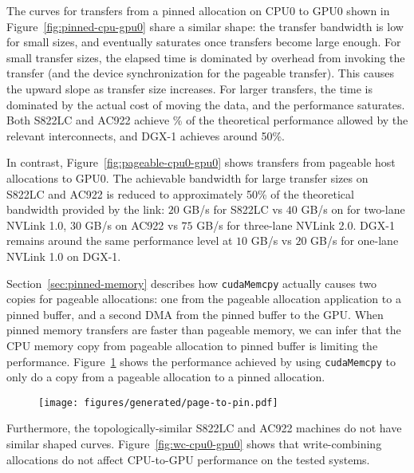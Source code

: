 The curves for transfers from a pinned allocation on CPU0 to GPU0 shown in Figure~\ref{fig:pinned-cpu-gpu0} share a similar shape: the transfer bandwidth is low for small sizes, and eventually saturates once transfers become large enough.
For small transfer sizes, the elapsed time is dominated by overhead from invoking the transfer (and the device synchronization for the pageable transfer).
This causes the upward slope as transfer size increases.
For larger transfers, the time is dominated by the actual cost of moving the data, and the performance saturates.
Both S822LC and AC922 achieve \% of the theoretical performance allowed by the relevant interconnects, and DGX-1 achieves around 50\%.


In contrast, Figure~\ref{fig:pageable-cpu0-gpu0} shows transfers from pageable host allocations to GPU0.
The achievable bandwidth for large transfer sizes on S822LC and AC922 is reduced to approximately 50\% of the theoretical bandwidth provided by the link: $20$ GB/s for S822LC vs $40$ GB/s on for two-lane NVLink 1.0, $30$ GB/s on AC922 vs $75$ GB/s for three-lane NVLink 2.0.
DGX-1 remains around the same performance level at $10$ GB/s vs $20$ GB/s for one-lane NVLink 1.0 on DGX-1.

Section~\ref{sec:pinned-memory} describes how \texttt{cudaMemcpy} actually causes two copies for pageable allocations: one from the pageable allocation application to a pinned buffer, and a second DMA from the pinned buffer to the GPU.
When pinned memory transfers are faster than pageable memory, we can infer that the CPU memory copy from pageable allocation to pinned buffer is limiting the performance.
Figure~\ref{fig:explicit-pageable-cpu} shows the performance achieved by using \texttt{cudaMemcpy} to only do a copy from a pageable allocation to a pinned allocation.


\begin{figure}[ht]
	\centering
	\texttt{[image: figures/generated/page-to-pin.pdf]}
	\caption[]{}
	\label{fig:explicit-pageable-cpu}
\end{figure}

Furthermore, the topologically-similar S822LC and AC922 machines do not have similar shaped curves.
Figure~\ref{fig:wc-cpu0-gpu0} shows that write-combining allocations do not affect CPU-to-GPU performance on the tested systems.


